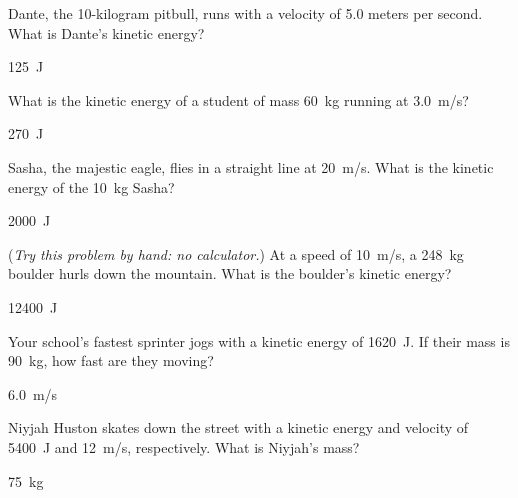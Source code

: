 \documentclass[answers]{exam}
\begin{document}
\begin{questions}

\question \label{taHSMX}
Dante, the 10-kilogram pitbull, runs with a velocity of 5.0 meters per second. What is Dante's kinetic energy?

\begin{solution}
\SI{125}{J}
\end{solution}

\question \label{QRI2H9}
What is the kinetic energy of a student of mass \SI{60}{kg} running at \SI{3.0}{m/s}?

\begin{solution}
\SI{270}{J}
\end{solution}


\question \label{ixc46e}
Sasha, the majestic eagle, flies in a straight line at \SI{20}{m/s}. What is the kinetic energy of the \SI{10}{kg} Sasha? 

\begin{solution}
\SI{2000}{J}
\end{solution}


\question \label{dguWEr}
(\textit{Try this problem by hand: no calculator.}) At a speed of \SI{10}{m/s}, a \SI{248}{kg} boulder hurls down the mountain. What is the boulder's kinetic energy?

\begin{solution}
\SI{12400}{J}
\end{solution}

\question \label{rUr2P8}
Your school's fastest sprinter jogs with a kinetic energy of \SI{1620}{J}. If their mass is \SI{90}{kg}, how fast are they moving?

\begin{solution}
\SI{6.0}{m/s}
\end{solution}

\question \label{2rrR9W}
Niyjah Huston skates down the street with a kinetic energy and velocity of \SI{5400}{J} and \SI{12}{m/s}, respectively. What is Niyjah's mass?

\begin{solution}
\SI{75}{kg}
\end{solution}


\end{questions}
\end{document}
